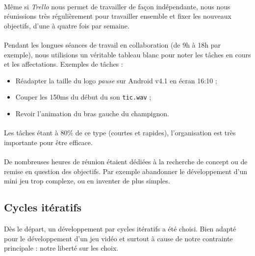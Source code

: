 \paragraph{}
Même si \textit{Trello} nous permet de travailler de façon indépendante, nous nous réunissions très régulièrement pour travailler ensemble et fixer les nouveaux objectifs, d'une à quatre fois par semaine.

\paragraph{}
Pendant les longues séances de travail en collaboration (de 9h à 18h par exemple), nous utilisions un véritable tableau blanc pour noter les tâches en cours et les affectations. Exemples de tâches :

\begin{itemize}
\item Réadapter la taille du logo \textit{pause} sur Android v4.1 en écran 16:10 ;
\item Couper les 150ms du début du son \texttt{tic.wav} ;
\item Revoir l’animation du bras gauche du champignon.
\end{itemize}

\paragraph{}
Les tâches étant à 80\% de ce type (courtes et rapides), l’organisation est très importante pour être efficace.

\paragraph{}
De nombreuses heures de réunion étaient dédiées à la recherche de concept ou de remise en question des objectifs. Par exemple abandonner le développement d’un mini jeu trop complexe, ou en inventer de plus simples.

\subsection{Cycles itératifs}

\paragraph{}
Dès le départ, un développement par cycles itératifs a été choisi. Bien adapté pour le développement d’un jeu vidéo et surtout à cause de notre contrainte principale : notre liberté sur les choix.

